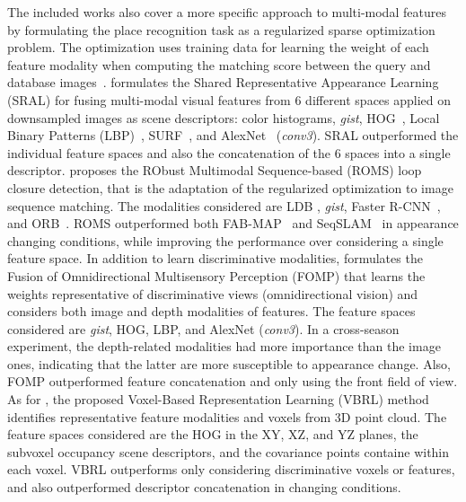 The included works also cover a more specific approach to multi-modal features by formulating the place recognition task as a regularized sparse optimization problem. The optimization uses training data for learning the weight of each feature modality when computing the matching score between the query and database images~\parencite{han-et-al:2017:2662061,han-et-al:2018:3,siva-zhang:2018:8461042,siva-et-al:2020:9340992}.
\cite{han-et-al:2017:2662061} formulates the Shared Representative Appearance Learning (SRAL) for fusing multi-modal visual features from 6 different spaces applied on downsampled images as scene descriptors: color histograms, \textit{gist}, HOG~\parencite{original:hog}, Local Binary Patterns (LBP)~\parencite{original:lbp}, SURF~\parencite{original:surf}, and AlexNet~\parencite{original:alexnet} (\textit{conv3}). SRAL outperformed the individual feature spaces and also the concatenation of the 6 spaces into a single descriptor.
\cite{han-et-al:2018:3} proposes the RObust Multimodal Sequence-based (ROMS) loop closure detection, that is the adaptation of the regularized optimization to image sequence matching. The modalities considered are LDB \parencite{original:ldb}, \textit{gist}, Faster R-CNN~\parencite{original:faster-rcnn}, and ORB~\parencite{original:orb}. ROMS outperformed both FAB-MAP~\parencite{discussion:fab-map} and SeqSLAM~\parencite{discussion:seqslam} in appearance changing conditions, while improving the performance over considering a single feature space.
In addition to learn discriminative modalities, \cite{siva-zhang:2018:8461042} formulates the Fusion of Omnidirectional Multisensory Perception (FOMP) that learns the weights representative of discriminative views (omnidirectional vision) and considers both image and depth modalities of features. The feature spaces considered are \textit{gist}, HOG, LBP, and AlexNet (\textit{conv3}). In a cross-season experiment, the depth-related modalities had more importance than the image ones, indicating that the latter are more susceptible to appearance change. Also, FOMP outperformed feature concatenation and only using the front field of view.
As for \cite{siva-et-al:2020:9340992}, the proposed Voxel-Based Representation Learning (VBRL) method identifies representative feature modalities and voxels from 3D point cloud. The feature spaces considered are the HOG in the XY, XZ, and YZ planes, the subvoxel occupancy scene descriptors, and the covariance points containe within each voxel. VBRL outperforms only considering discriminative voxels or features, and also outperformed descriptor concatenation in changing conditions.




